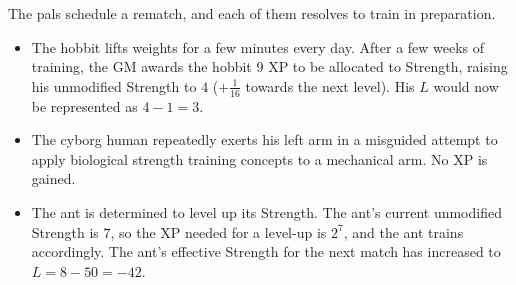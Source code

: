 \begin{example}
The pals schedule a rematch, and each of them resolves to train in preparation.
\begin{itemize}
\item
The hobbit lifts weights for a few minutes every day.
After a few weeks of training,
the GM awards the hobbit $9$ XP to be allocated to Strength, raising his unmodified Strength to $4$ ($+\frac{1}{16}$ towards the next level).
His $L$ would now be represented as $4-1=3$.
\item
The cyborg human repeatedly exerts his left arm in a misguided attempt to apply biological strength training concepts to a mechanical arm.
No XP is gained.
\item
The ant is determined to level up its Strength.
The ant’s current unmodified Strength is $7$, so the XP needed for a level-up is $2^7$, and the ant trains accordingly.
The ant’s effective Strength for the next match has increased to $L=8-50=-42$.
\end{itemize}
\end{example}
